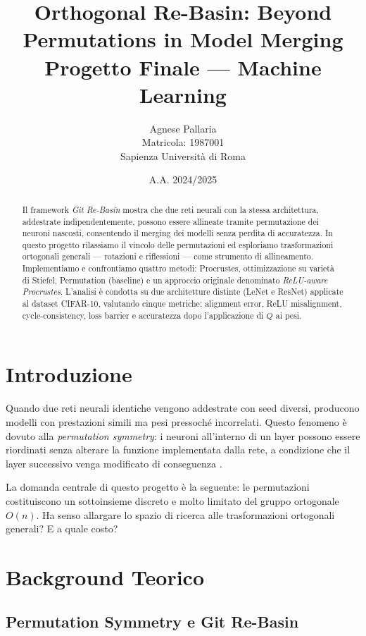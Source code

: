 \documentclass[11pt, a4paper]{article}
\title{\textbf{Orthogonal Re-Basin: Beyond Permutations in Model Merging}\\[0.4em]
\large Progetto Finale — Machine Learning}
\author{Agnese Pallaria\\
Matricola: 1987001\\
Sapienza Università di Roma}
\date{A.A. 2024/2025}
\begin{document}
\maketitle

\begin{abstract}
Il framework \emph{Git Re-Basin} \cite{ainsworth2022} mostra che due reti neurali con la stessa architettura, addestrate indipendentemente, possono essere allineate tramite permutazione dei neuroni nascosti, consentendo il merging dei modelli senza perdita di accuratezza. In questo progetto rilassiamo il vincolo delle permutazioni ed esploriamo trasformazioni ortogonali generali — rotazioni e riflessioni — come strumento di allineamento. Implementiamo e confrontiamo quattro metodi: Procrustes, ottimizzazione su varietà di Stiefel, Permutation (baseline) e un approccio originale denominato \emph{ReLU-aware Procrustes}. L'analisi è condotta su due architetture distinte (LeNet e ResNet) applicate al dataset CIFAR-10, valutando cinque metriche: alignment error, ReLU misalignment, cycle-consistency, loss barrier e accuratezza dopo l'applicazione di $Q$ ai pesi.
\end{abstract}

\section{Introduzione}

Quando due reti neurali identiche vengono addestrate con seed diversi, producono modelli con prestazioni simili ma pesi pressoché incorrelati. Questo fenomeno è dovuto alla \emph{permutation symmetry}: i neuroni all'interno di un layer possono essere riordinati senza alterare la funzione implementata dalla rete, a condizione che il layer successivo venga modificato di conseguenza \cite{ainsworth2022}.

La domanda centrale di questo progetto è la seguente: le permutazioni costituiscono un sottoinsieme discreto e molto limitato del gruppo ortogonale $O(n)$. Ha senso allargare lo spazio di ricerca alle trasformazioni ortogonali generali? E a quale costo?

\section{Background Teorico}

\subsection{Permutation Symmetry e Git Re-Basin}
\end{document}
